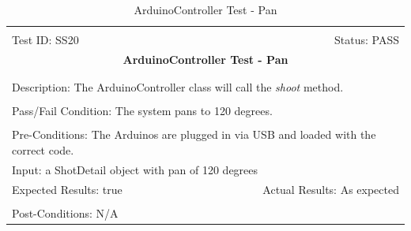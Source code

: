 \documentclass[11pt]{article}
\begin{document}
\begin{center}
\begin{table}[H]
\begin{tabular}{|l r|}\hline&\\[-2mm]
	Test ID: SS20	&Status: PASS\\[-3mm]
	\multicolumn{2}{|c|}{\textbf{\large{ArduinoController Test - Pan}}}\\&\\\hline&\\[-3mm]
	\multicolumn{2}{|p{\textwidth}|}{Description: The ArduinoController class will call the \textit{shoot} method.}\\[1mm]\hline&\\[-3mm]
	\multicolumn{2}{|p{\textwidth}|}{Pass/Fail Condition: The system pans to 120 degrees.}\\[1mm]\hline&\\[-3mm]
	\multicolumn{2}{|p{\textwidth}|}{Pre-Conditions: The Arduinos are plugged in via USB and loaded with the correct code.}\\[4mm]
	\multicolumn{2}{|p{\textwidth}|}{Input: a ShotDetail object with pan of 120 degrees}\\[2mm]\hline
	\multicolumn{1}{|p{0.49\textwidth}}{Expected Results: true}	&\multicolumn{1}{|p{0.45\textwidth}|}{Actual Results: As expected}\\\hline&\\[-3mm]
	\multicolumn{2}{|p{\textwidth}|}{Post-Conditions: N/A}\\\hline
\end{tabular}
\caption{ArduinoController Test - Pan}
\end{table}
\end{center}
\end{document}
